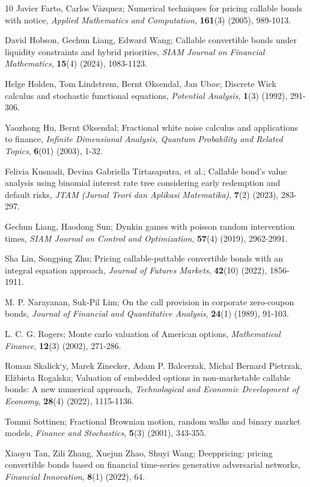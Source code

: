 \documentclass[reqno]{amsart}
\begin{document}
\begin{thebibliography}{10}
 Javier Farto, Carlos V\'{a}zquez;
Numerical techniques for pricing callable bonds with notice,
\emph{Applied Mathematics and Computation}, \textbf{161}(3) (2005), 989-1013.

 David Hobson, Gechun Liang, Edward Wang;
Callable convertible bonds under liquidity constraints and hybrid priorities,
\emph{SIAM Journal on Financial Mathematics}, \textbf{15}(4) (2024), 1083-1123.

 Helge Holden, Tom Lindstr{\o}m, Bernt {\O}ksendal, 
 Jan Ub{\o}e;
Discrete Wick calculus and stochastic functional equations,
\emph{Potential Analysis}, \textbf{1}(3) (1992), 291-306.

 Yaozhong Hu, Bernt {\O}ksendal;
Fractional white noise calculus and applications to finance,
\emph{Infinite Dimensional Analysis, Quantum Probability and Related Topics}, \textbf{6}(01) (2003), 1-32.

 Felivia Kusnadi, Devina Gabriella Tirtasaputra, et al.;
Callable bond's value analysis using binomial interest rate tree considering early redemption and default risks,
\emph{JTAM (Jurnal Teori dan Aplikasi Matematika)}, \textbf{7}(2) (2023), 283-297.

 Gechun Liang, Haodong Sun;
Dynkin games with poisson random intervention times,
\emph{SIAM Journal on Control and Optimization}, \textbf{57}(4) (2019), 2962-2991.

 Sha Lin, Songping Zhu;
Pricing callable-puttable convertible bonds with an integral equation approach,
\emph{Journal of Futures Markets}, \textbf{42}(10) (2022), 1856-1911.

 M. P. Narayanan, Suk-Pil Lim;
On the call provision in corporate zero-coupon bonds,
\emph{Journal of Financial and Quantitative Analysis}, \textbf{24}(1) (1989), 91-103.

 L. C. G. Rogers;
Monte carlo valuation of American options,
\emph{Mathematical Finance}, \textbf{12}(3) (2002), 271-286.

 Roman Skalick`{y}, Marek Zinecker, Adam P. Balcerzak, 
Michal Bernard Pietrzak,  El\.{z}bieta Rogalska;
Valuation of embedded options in non-marketable callable bonds: A new numerical approach,
\emph{Technological and Economic Development of Economy}, \textbf{28}(4) (2022), 1115-1136.

 Tommi Sottinen;
Fractional Brownian motion, random walks and binary market models,
\emph{Finance and Stochastics}, \textbf{5}(3) (2001), 343-355.

 Xiaoyu Tan, Zili Zhang, Xuejun Zhao, Shuyi Wang;
Deeppricing: pricing convertible bonds based on financial time-series generative adversarial networks,
\emph{Financial Innovation}, \textbf{8}(1) (2022), 64.

\end{thebibliography}
\end{document}
